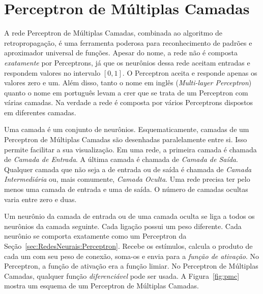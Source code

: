 \section{Perceptron de Múltiplas Camadas}

A rede Perceptron de Múltiplas Camadas, combinada ao algoritmo de retropropagação, é uma ferramenta poderosa para reconhecimento de padrões e aproximador universal de funções. Apesar do nome, a rede não é composta \emph{exatamente} por Perceptrons, já que os neurônios dessa rede aceitam entradas e respondem valores no intervalo $[0, 1]$. O Perceptron aceita e responde apenas os valores zero e um. Além disso, tanto o nome em inglês (\emph{Multi-layer Perceptron}) quanto o nome em português levam a crer que se trata de um Perceptron com várias camadas. Na verdade a rede é composta por vários Perceptrons dispostos em diferentes camadas.

Uma camada é um conjunto de neurônios. Esquematicamente, camadas de um Perceptron de Múltiplas Camadas são desenhadas paralelamente entre si. Isso permite facilitar a sua visualização. Em uma rede, a primeira camada é chamada de \emph{Camada de Entrada}. A última camada é chamada de \emph{Camada de Saída}. Qualquer camada que não seja a de entrada ou de saída é chamada de \emph{Camada Intermediária} ou, mais comumente, \emph{Camada Oculta}. Uma rede precisa ter pelo menos uma camada de entrada e uma de saída. O número de camadas ocultas varia entre zero e duas.

Um neurônio da camada de entrada ou de uma camada oculta se liga a todos os neurônios da camada seguinte. Cada ligação possui um peso diferente. Cada neurônio se comporta exatamente como um Perceptron da Seção~\ref{sec:RedesNeurais:Perceptron}. Recebe os estímulos, calcula o produto de cada um com seu peso de conexão, soma-os e envia para a \emph{função de ativação}. No Perceptron, a função de ativação era a função limiar. No Perceptron de Múltiplas Camadas, qualquer função \emph{diferenciável} pode ser usada. A Figura~\ref{fig:pmc} mostra um esquema de um Perceptron de Múltiplas Camadas.

